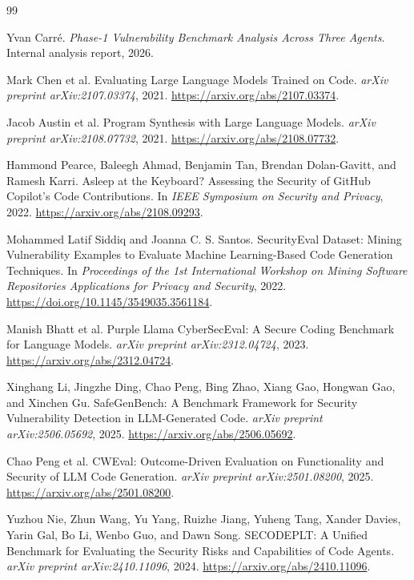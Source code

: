 \documentclass[11pt]{article}
\begin{document}
\begin{thebibliography}{99}


Yvan Carré.
\newblock \emph{Phase-1 Vulnerability Benchmark Analysis Across Three Agents}.
\newblock Internal analysis report, 2026.

Mark Chen et al.
\newblock Evaluating Large Language Models Trained on Code.
\newblock \emph{arXiv preprint arXiv:2107.03374}, 2021.
\newblock \url{https://arxiv.org/abs/2107.03374}.

Jacob Austin et al.
\newblock Program Synthesis with Large Language Models.
\newblock \emph{arXiv preprint arXiv:2108.07732}, 2021.
\newblock \url{https://arxiv.org/abs/2108.07732}.

Hammond Pearce, Baleegh Ahmad, Benjamin Tan, Brendan Dolan-Gavitt, and Ramesh Karri.
\newblock Asleep at the Keyboard? Assessing the Security of GitHub Copilot's Code Contributions.
\newblock In \emph{IEEE Symposium on Security and Privacy}, 2022.
\newblock \url{https://arxiv.org/abs/2108.09293}.

Mohammed Latif Siddiq and Joanna C. S. Santos.
\newblock SecurityEval Dataset: Mining Vulnerability Examples to Evaluate Machine Learning-Based Code Generation Techniques.
\newblock In \emph{Proceedings of the 1st International Workshop on Mining Software Repositories Applications for Privacy and Security}, 2022.
\newblock \url{https://doi.org/10.1145/3549035.3561184}.

Manish Bhatt et al.
\newblock Purple Llama CyberSecEval: A Secure Coding Benchmark for Language Models.
\newblock \emph{arXiv preprint arXiv:2312.04724}, 2023.
\newblock \url{https://arxiv.org/abs/2312.04724}.

Xinghang Li, Jingzhe Ding, Chao Peng, Bing Zhao, Xiang Gao, Hongwan Gao, and Xinchen Gu.
\newblock SafeGenBench: A Benchmark Framework for Security Vulnerability Detection in LLM-Generated Code.
\newblock \emph{arXiv preprint arXiv:2506.05692}, 2025.
\newblock \url{https://arxiv.org/abs/2506.05692}.

Chao Peng et al.
\newblock CWEval: Outcome-Driven Evaluation on Functionality and Security of LLM Code Generation.
\newblock \emph{arXiv preprint arXiv:2501.08200}, 2025.
\newblock \url{https://arxiv.org/abs/2501.08200}.

Yuzhou Nie, Zhun Wang, Yu Yang, Ruizhe Jiang, Yuheng Tang, Xander Davies, Yarin Gal, Bo Li, Wenbo Guo, and Dawn Song.
\newblock SECODEPLT: A Unified Benchmark for Evaluating the Security Risks and Capabilities of Code Agents.
\newblock \emph{arXiv preprint arXiv:2410.11096}, 2024.
\newblock \url{https://arxiv.org/abs/2410.11096}.


\end{thebibliography}
\end{document}

